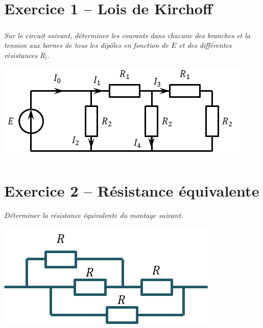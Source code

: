 \documentclass[10pt,fleqn]{article} %
\begin{document}

\vspace{5.5cm}
\pagestyle{fancy}
\thispagestyle{plain}


\def\columnseprulecolor{\color{ocre}}
\setlength{\columnseprule}{0.4pt} 

\begin{multicols}{2}
\section*{Exercice 1 -- Lois de Kirchoff}
\ifprof
\else
\fi


\subparagraph*{}
\textit{Sur le circuit suivant, déterminer les courants dans chacune des branches et la tension aux bornes de tous les dipôles en fonction de $E$ et des différentes résistances $R_i$.}
\begin{center}
\includegraphics[width=\linewidth]{images/fig_03}
\end{center}


\section*{Exercice 2 -- Résistance équivalente}
\textit{Déterminer la résistance équivalente du montage suivant.}
\begin{center}
\includegraphics[width=\linewidth]{images/fig_07}
\end{center}





\end{multicols}
\end{document}
